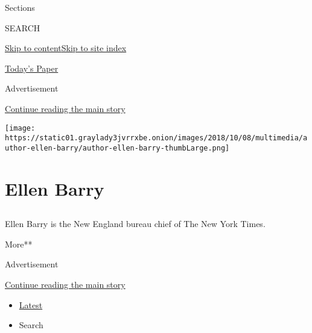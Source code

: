 Sections

SEARCH

\protect\hyperlink{site-content}{Skip to
content}\protect\hyperlink{site-index}{Skip to site index}

\href{https://myaccount.nytimes3xbfgragh.onion/auth/login?response_type=cookie\&client_id=vi}{}

\href{https://www.nytimes3xbfgragh.onion/section/todayspaper}{Today's
Paper}

Advertisement

\protect\hyperlink{after-top}{Continue reading the main story}

\texttt{[image: https://static01.graylady3jvrrxbe.onion/images/2018/10/08/multimedia/author-ellen-barry/author-ellen-barry-thumbLarge.png]}

\hypertarget{ellen-barry}{%
\section{Ellen Barry}\label{ellen-barry}}

\subsection{}

Ellen Barry is the New England bureau chief of The New York Times.

More**

Advertisement

\protect\hyperlink{after-mid1}{Continue reading the main story}

\begin{itemize}
\tightlist
\item
  \protect\hyperlink{stream-panel}{Latest}
\item
  Search
\end{itemize}

